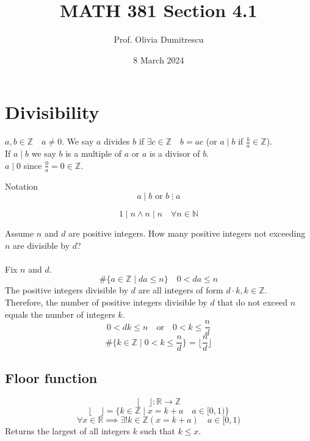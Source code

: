 \documentclass[letterpaper, 12pt]{article}
\title{MATH 381 Section 4.1}
\author{Prof. Olivia Dumitrescu}
\date{8 March 2024}
\newenvironment{definition}[1][Definition]{\begin{trivlist}
\item[\hskip \labelsep {\bfseries #1}]}{\end{trivlist}}
\newenvironment{example}[1][Example]{\begin{trivlist}
\item[\hskip \labelsep {\bfseries #1}]}{\end{trivlist}}
\newenvironment{remark}[1][Remark]{\begin{trivlist}
\item[\hskip \labelsep {\bfseries #1}]}{\end{trivlist}}
\newcommand{\N}{\mathbb{N}}
\newcommand{\Z}{\mathbb{Z}}
\newcommand{\R}{\mathbb{R}}
\newcommand{\0}{\emptyset}
\newcommand{\divby}{\; \vdots \;}
\begin{document}
    \maketitle
    \section*{Divisibility}
    \begin{definition}
        $a, b \in \Z \quad a \ne 0$. We say $a$ divides $b$ if $\exists c \in \Z \quad b = ac$ 
        (or $a \mid b$ if $\frac{b}{a} \in \Z$). \\
        If $a \mid b$ we say $b$ is a multiple of $a$ or $a$ is a divisor of $b$. \\
        $a \mid 0$ since $\frac{0}{a} = 0 \in \Z$.
    \end{definition}
    \begin{remark} Notation \\
        \[a \mid b \text { or } b \divby a \]
    \end{remark}
    \begin{remark}
        \[1 \mid n \wedge n \mid n \quad \forall n \in \N\]
    \end{remark}
    \begin{example}
        Assume $n$ and $d$ are positive integers. How many positive integers not exceeding $n$ 
        are divisible by $d$? \\
        \\
        Fix $n$ and $d$.
        \[\#\{a \in \Z \mid da \le n\} \quad 0 < da \le n\]
        The positive integers divisible by $d$ are all integers of form $d \cdot k, k \in \Z$. \\
        Therefore, the number of positive integers divisible by $d$ that do not exceed $n$ equals 
        the number of integers $k$.
        \[0 < dk \le n \quad \text{or} \quad 0 < k \le \frac{n}{d}\]
        \[\# \{k \in \Z \mid 0 < k \le \frac{n}{d}\} = \lfloor \frac{n}{d} \rfloor\]
    \end{example}
    \subsection*{Floor function}
    \[\lfloor \quad \rfloor : \R \to \Z\]
    \[\lfloor \quad \rfloor = \{k \in \Z \mid x = k + a \quad a \in [0, 1)\}\]
    \[\forall x \in \R \implies \exists! k \in \Z(x = k + a) \quad a \in [0, 1)\]
    Returns the largest of all integers $k$ such that $k \le x$.
\end{document}

